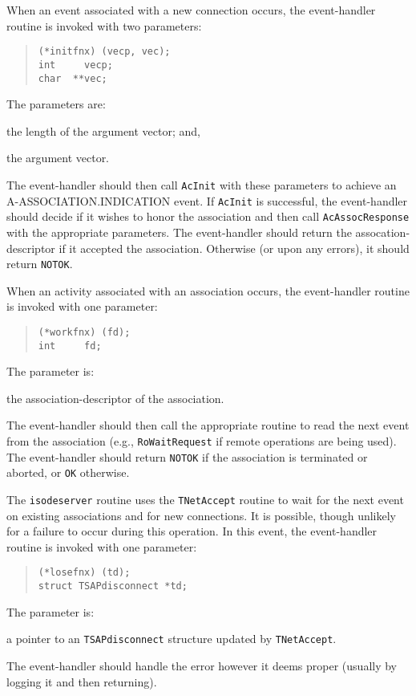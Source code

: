 When an event associated with a new connection occurs,
the event-handler routine is invoked with two parameters:
\begin{quote}\small\begin{verbatim}
(*initfnx) (vecp, vec);
int     vecp;
char  **vec;
\end{verbatim}\end{quote}
The parameters are:
\begin{describe}
\item[\verb"vecp":] the length of the argument vector;
and,

\item[\verb"vec":] the argument vector.
\end{describe}
The event-handler should then call \verb"AcInit" with these parameters
to achieve an {\sf A-ASSOCIATION.INDICATION\/} event.
If \verb"AcInit" is successful,
the event-handler should decide if it wishes to honor the association
and then call \verb"AcAssocResponse" with the appropriate parameters.
The event-handler should return the assocation-descriptor if it accepted the
association.
Otherwise (or upon any errors),
it should return \verb"NOTOK".

When an activity associated with an association occurs,
the event-handler routine is invoked with one parameter:
\begin{quote}\small\begin{verbatim}
(*workfnx) (fd);
int     fd;
\end{verbatim}\end{quote}
The parameter is:
\begin{describe}
\item[\verb"fd":] the association-descriptor of the association.
\end{describe}
The event-handler should then call the appropriate routine to read the next
event from the association
(e.g., \verb"RoWaitRequest" if remote operations are being used).
The event-handler should return \verb"NOTOK" if the association is terminated
or aborted,
or \verb"OK" otherwise.

The \verb"isodeserver" routine uses the \verb"TNetAccept" routine to
wait for the next event on existing associations and for new connections.
It is possible, though unlikely for a failure to occur during this operation.
In this event,
the event-handler routine is invoked with one parameter:
\begin{quote}\small\begin{verbatim}
(*losefnx) (td);
struct TSAPdisconnect *td;
\end{verbatim}\end{quote}
The parameter is:
\begin{describe}
\item[\verb"td":] a pointer to an \verb"TSAPdisconnect" structure updated
by \verb"TNetAccept".
\end{describe}
The event-handler should handle the error however it deems proper
(usually by logging it and then returning).

